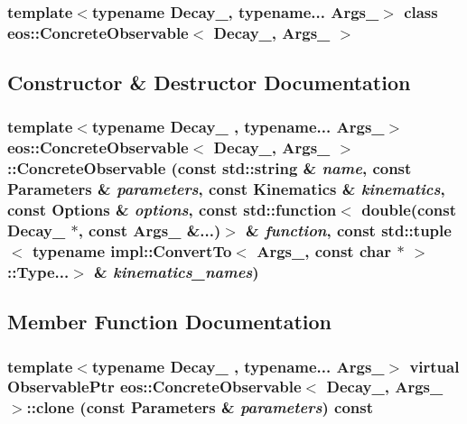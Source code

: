 \subsubsection*{template$<$typename Decay\_\-, typename... Args\_\-$>$ class eos::ConcreteObservable$<$ Decay\_\-, Args\_\- $>$}



\subsection{Constructor \& Destructor Documentation}
\hypertarget{classeos_1_1ConcreteObservable_a194b98ae4633deff5c8d52d743efe6c3}{
\subsubsection[{ConcreteObservable}]{\setlength{\rightskip}{0pt plus 5cm}template$<$typename Decay\_\- , typename... Args\_\-$>$ {\bf eos::ConcreteObservable}$<$ Decay\_\-, Args\_\- $>$::{\bf ConcreteObservable} (const std::string \& {\em name}, \/  const {\bf Parameters} \& {\em parameters}, \/  const {\bf Kinematics} \& {\em kinematics}, \/  const {\bf Options} \& {\em options}, \/  const std::function$<$ double(const Decay\_\- $\ast$, const Args\_\- \&...)$>$ \& {\em function}, \/  const std::tuple$<$ typename impl::ConvertTo$<$ Args\_\-, const char $\ast$ $>$::Type...$>$ \& {\em kinematics\_\-names})}}
\label{classeos_1_1ConcreteObservable_a194b98ae4633deff5c8d52d743efe6c3}


\subsection{Member Function Documentation}
\hypertarget{classeos_1_1ConcreteObservable_afe63f75a6814eda8dca5d1e842f71fc6}{
\subsubsection[{clone}]{\setlength{\rightskip}{0pt plus 5cm}template$<$typename Decay\_\- , typename... Args\_\-$>$ virtual {\bf ObservablePtr} {\bf eos::ConcreteObservable}$<$ Decay\_\-, Args\_\- $>$::clone (const {\bf Parameters} \& {\em parameters}) const}}
\label{classeos_1_1ConcreteObservable_afe63f75a6814eda8dca5d1e842f71fc6}


